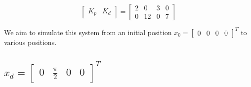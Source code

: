 \documentclass{article}
\begin{document}
\begin{equation}
    \begin{bmatrix} K_p & K_d \end{bmatrix} = \begin{bmatrix}
        2 & 0 & 3 & 0 \\
        0 & 12 & 0 & 7
    \end{bmatrix}
\end{equation}

We aim to simulate this system from an initial position $x_0 = \begin{bmatrix}0 & 0 & 0 & 0 \end{bmatrix}^T$ to various positions.

\subsection*{$x_d = \begin{bmatrix}0 & \frac{\pi}{2} & 0 & 0 \end{bmatrix}^T$}
\end{document}
